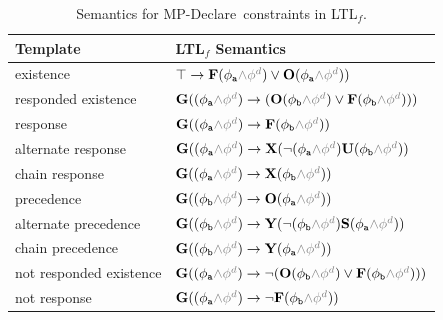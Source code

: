 \begin{table}[t!]
\caption{Semantics for MP-Declare\ constraints in LTL$_f$. \label{tbl:timed-mfotl}}
\centering
\scriptsize{
\begin{tabular}{ll}
\toprule
\textbf{Template} & \textbf{LTL$_f$ Semantics} \\
\midrule
existence & $\top \rightarrow \lfuture (\phi_{\texttt{a}} \textcolor{gray}{\wedge \phi^d}) \vee \lonce (\phi_{\texttt{a}} \textcolor{gray}{\wedge \phi^d}))$ \\
\midrule  
responded existence  & $\lglobally( (\phi_{\texttt{a}} \textcolor{gray}{\wedge \phi^d}) \rightarrow (\lonce (\phi_{\texttt{b}} \textcolor{gray}{\wedge \phi^d}) \vee \lfuture (\phi_{\texttt{b}} \textcolor{gray}{\wedge \phi^d})))$ \\
\midrule
response &  $\lglobally(  (\phi_{\texttt{a}} \textcolor{gray}{\wedge \phi^d}) \rightarrow \lfuture (\phi_{\texttt{b}} \textcolor{gray}{\wedge \phi^d}))$ \\
alternate response  & $ \lglobally( (\phi_{\texttt{a}} \textcolor{gray}{\wedge \phi^d}) \rightarrow \lnext(\neg (\phi_{\texttt{a}} \textcolor{gray}{\wedge \phi^d}) \luntil (\phi_{\texttt{b}} \textcolor{gray}{\wedge \phi^d}))$ \\
chain response &  $\lglobally( (\phi_{\texttt{a}} \textcolor{gray}{\wedge \phi^d}) \rightarrow \lnext (\phi_{\texttt{b}} \textcolor{gray}{\wedge \phi^d}))$ \\
\midrule
precedence &  $\lglobally( (\phi_{\texttt{b}} \textcolor{gray}{\wedge \phi^d}) \rightarrow \lonce (\phi_{\texttt{a}} \textcolor{gray}{\wedge \phi^d}))$ \\
alternate precedence & $ \lglobally( (\phi_{\texttt{b}} \textcolor{gray}{\wedge \phi^d}) \rightarrow \lyesterday(\neg (\phi_{\texttt{b}} \textcolor{gray}{\wedge \phi^d}) \lsince (\phi_{\texttt{a}} \textcolor{gray}{\wedge \phi^d}))$ \\
chain precedence & $\lglobally( (\phi_{\texttt{b}} \textcolor{gray}{\wedge \phi^d}) \rightarrow \lyesterday (\phi_{\texttt{a}} \textcolor{gray}{\wedge \phi^d}))$ \\
\midrule
not responded existence  &
$\lglobally( (\phi_{\texttt{a}} \textcolor{gray}{\wedge \phi^d}) \rightarrow \neg (\lonce (\phi_{\texttt{b}}   \textcolor{gray}{\wedge \phi^d}) \vee \lfuture (\phi_{\texttt{b}} \textcolor{gray}{\wedge \phi^d})))$ \\
not response  & $\lglobally(  (\phi_{\texttt{a}} \textcolor{gray}{\wedge \phi^d}) \rightarrow \neg \lfuture (\phi_{\texttt{b}} \textcolor{gray}{\wedge \phi^d}))$ \\

\end{tabular}}
\end{table}
